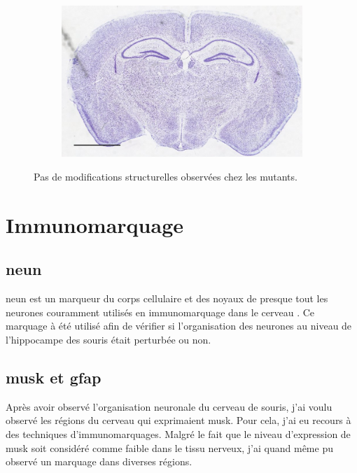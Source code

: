 \begin{figure}[h]
\begin{center}
\begin{subfigure}[h]{0.49\textwidth}
		\end{subfigure}
		\begin{subfigure}[h]{0.49\textwidth}%
			\caption{}
			\label{fig:MaleMutNissl}
			\includegraphics[width=\textwidth]{./Images/Nissl/MaleMut.jpg}
		\end{subfigure}
	\end{center}
	\caption{Pas de modifications structurelles observées chez les mutants.}
	\label{fig:NisslResultat}
\end{figure}

\section{Immunomarquage}
\label{sec:IHC}

\subsection{\acrshort{neun}}
\label{ssec:neun}
\Acrshort{neun} est un marqueur du  corps cellulaire et des noyaux de presque tout les neurones couramment utilisés en immunomarquage dans le cerveau \cite{Guselnikova2015}. Ce marquage à été utilisé afin de vérifier si l'organisation des neurones au niveau de l'hippocampe des souris \mcrd était perturbée ou non.

\subsection{\acrshort{musk} et \acrshort{gfap}}
\label{ssec:musk}
Après avoir observé l'organisation neuronale du cerveau de souris, j'ai voulu observé les régions du cerveau qui exprimaient \gls{musk}. Pour cela, j'ai eu recours à des techniques d'immunomarquages. Malgré le fait que le niveau d'expression de \gls{musk} soit considéré comme faible dans le tissu nerveux, j'ai quand même pu observé un marquage dans diverses régions.

